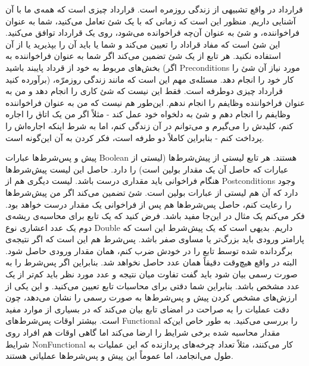 قرارداد در واقع تشبیهی از زندگی روزمره است. قرارداد چیزی است که همه‌ی ما با آن آشنایی داریم. منظور این است که زمانی که با یک شئ تعامل می‌کنید، شما به عنوان فراخواننده، و شئ به عنوان آن‌چه فراخوانده می‌شود، روی یک قرارداد توافق می‌کنید. این شئ است که مفاد قراداد را تعیین می‌کند و شما یا باید آن را بپذیرید یا از آن استفاده نکنید. هر تابع از یک شئ تضمین می‌کند اگر شما به عنوان فراخواننده به بخش‌های مربوط به خود از قرداد پایبند باشید (اگر 
\glspl{Precondition}
مورد نیاز آن شئ را برآورده کنید) کار خود را انجام دهد. مسئله‌ی مهم این است که مانند زندگی روزمرّه، قرارداد چیزی دوطرفه است. فقط این نیست که شئ کاری را انجام دهد و من به عنوان فراخواننده وظایفم را انجام ندهم. این‌طور هم نیست که من به عنوان فراخواننده وظایفم را انجام دهم و شئ به دلخواه خود عمل کند - مثلاً اگر من یک اتاق را اجاره کنم، کلیدش را می‌گیرم و می‌توانم در آن زندگی کنم، اما به شرط اینکه اجاره‌اش را پرداخت کنم - بنابراین کاملاً دو طرفه است، فکر کردن به آن این‌گونه است.


پیش و پس‌شرط‌ها عبارات
\gls{Boolean}
هستند. هر تابع لیستی از پیش‌شرط‌ها (لیستی از عبارات که حاصل آن یک مقدار بولین است) را دارد. حاصل این لیست پیش‌شرط‌ها هنگام فراخوانی باید مقداری درست باشد. لیست دیگری هم از
\glspl{Postcondition}
 وجود دارد که آن هم لیستی از عبارات بولین است. شئ تضمین می‌کند اگر من پیش‌شرط‌ها را رعایت کنم، حاصل پس‌شرط‌ها هم پس از فراخوانی یک مقدار درست خواهد بود. فکر می‌کنم یک مثال در این‌جا مفید باشد. فرض کنید که یک تابع برای محاسبه‌ی ریشه‌ی دوم یک عدد اعشاری نوع Double داریم. بدیهی است که یک پیش‌شرط این است که پارامتر ورودی باید بزرگ‌تر یا مساوی صفر باشد. پس‌شرط هم این است که اگر نتیجه‌ی برگردانده‌ شده توسط تابع را در خودش ضرب کنم، همان مقدار ورودی حاصل شود. البته در واقع هیچ‌وقت دقیقاً همان عدد حاصل نخواهد شد. بنابراین اگر پس‌شرط را به صورت رسمی بیان شود باید گفت تفاوت میان نتیجه و عدد مورد نظر باید کم‌تر از یک عدد مشخص باشد. بنابراین شما دقتی برای محاسبات تابع تعیین می‌کنید. و این یکی از ارزش‌های مشخص کردن پیش و پس‌شرط‌ها به صورت رسمی را نشان می‌دهد، چون دقت عملیات را به صراحت در امضای تابع بیان می‌کند که در بسیاری از موارد مفید است.
بیشتر اوقات پس‌شرط‌های 
\gls{Functional}
را بررسی می‌کنید. به طور خاص این‌که مقدار محاسبه شده برخی شرایط را ارضا می‌کند اما گاهی اوقات هم افراد روی شرایط 
\gls{NonFunctional}
کار می‌کنند، مثلاً تعداد چرخه‌های پردازنده که این عملیات به طول می‌انجامد،‌ اما عموماً این پیش و پس‌شرط‌ها عملیاتی هستند.

\singlespacing
\begin{figure}
	\begin{LTR}
		
	\end{LTR}
\end{figure}
\doublespacing

